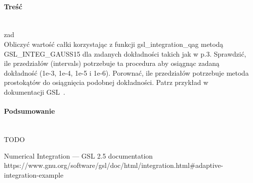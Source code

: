 \paragraph{Treść}~\\
{zad}\\
Obliczyć wartość całki korzystając z funkcji gsl\_integration\_qag metodą GSL\_INTEG\_GAUSS15 dla zadanych dokładności takich jak w p.3.
Sprawdzić, ile przedziałów (intervals) potrzebuje ta procedura aby osiągnąc zadaną dokładność (1e-3, 1e-4, 1e-5 i 1e-6).
Porownać, ile przedziałów potrzebuje metoda prostokątów do osiągnięcia podobnej dokładności.
Patrz przykład w dokumentacji GSL~\cite{NumericalIntegrationGSL25Documentation}.



\paragraph{Podsumowanie}~\\
TODO

\begin{thebibliography}{9}
   Numerical Integration — GSL 2.5 documentation https://www.gnu.org/software/gsl/doc/html/integration.html\#adaptive-integration-example
\end{thebibliography}
